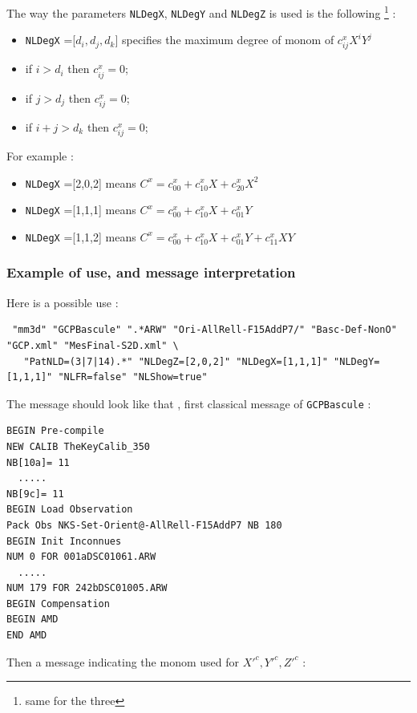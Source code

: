 The way the parameters  {\tt NLDegX}, {\tt NLDegY} and  {\tt NLDegZ} is used is the following \footnote{same for the three} :

\begin{itemize}
   \item  {\tt NLDegX} =[$d_i,d_j,d_k]$ specifies the maximum degree of   monom of $c^x_{ij} X^i Y^j$
   \item  if  $ i > d_i$ then  $c^x_{ij}=0$;
   \item  if  $ j > d_j$ then  $c^x_{ij}=0$;
   \item  if  $ i+j > d_k$ then  $c^x_{ij}=0$;
\end{itemize}

For example :


\begin{itemize}
   \item  {\tt NLDegX} =[2,0,2] means $C^x = c^x_{00} + c^x_{10} X + c^x_{20} X^2$
   \item  {\tt NLDegX} =[1,1,1] means $C^x = c^x_{00} + c^x_{10} X + c^x_{01} Y$
   \item  {\tt NLDegX} =[1,1,2] means $C^x = c^x_{00} + c^x_{10} X + c^x_{01} Y +  c^x_{11} XY$
\end{itemize}



\subsubsection{Example of use, and message interpretation}

Here is a possible use :

{\small
\begin{verbatim}
 "mm3d" "GCPBascule" ".*ARW" "Ori-AllRell-F15AddP7/" "Basc-Def-NonO" "GCP.xml" "MesFinal-S2D.xml" \
   "PatNLD=(3|7|14).*" "NLDegZ=[2,0,2]" "NLDegX=[1,1,1]" "NLDegY=[1,1,1]" "NLFR=false" "NLShow=true"
\end{verbatim}
}

The message should look like that , first classical message of {\tt GCPBascule} :

\begin{verbatim}
BEGIN Pre-compile
NEW CALIB TheKeyCalib_350
NB[10a]= 11
  .....
NB[9c]= 11
BEGIN Load Observation
Pack Obs NKS-Set-Orient@-AllRell-F15AddP7 NB 180
BEGIN Init Inconnues
NUM 0 FOR 001aDSC01061.ARW
  .....
NUM 179 FOR 242bDSC01005.ARW
BEGIN Compensation
BEGIN AMD 
END AMD 
\end{verbatim}

Then  a message indicating the monom used for $X'^c,Y'^c,Z'^c$ :

